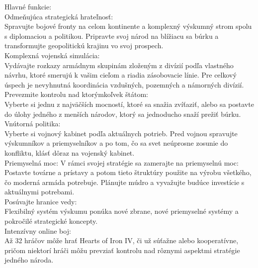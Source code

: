 \documentclass[10pt,oneside,slovak,a4paper]{article}
\begin{document}
Hlavné funkcie:\\
Odmeňujúca strategická hrateľnosť:\\
Spravujte bojové fronty na celom kontinente a komplexný výskumný strom spolu s diplomaciou a politikou. Pripravte svoj národ na blížiacu sa búrku a transformujte geopolitickú krajinu vo svoj prospech.\\
Komplexná vojenská simulácia:\\
Vydávajte rozkazy armádnym skupinám zloženým z divízií podľa vlastného návrhu, ktoré smerujú k vašim cieľom a riadia zásobovacie línie. Pre celkový úspech je nevyhnutná koordinácia vzdušných, pozemných a námorných divízií.
Prevezmite kontrolu nad ktorýmkoľvek štátom:\\
Vyberte si jednu z najväčších mocností, ktoré sa snažia zvíťaziť, alebo sa postavte do úlohy jedného z menších národov, ktorý sa jednoducho snaží prežiť búrku.\\
Vnútorná politika:\\
Vyberte si vojnový kabinet podľa aktuálnych potrieb. Pred vojnou spravujte výskumníkov a priemyselníkov a po tom, čo sa svet neúprosne zosunie do konfliktu, klásť dôraz na vojenský kabinet.\\
Priemyselná moc: V rámci svojej stratégie sa zamerajte na priemyselnú moc:\\
Postavte továrne a prístavy a potom tieto štruktúry použite na výrobu všetkého, čo moderná armáda potrebuje. Plánujte múdro a vyvažujte budúce investície s aktuálnymi potrebami.\\
Posúvajte hranice vedy:\\
Flexibilný systém výskumu ponúka nové zbrane, nové priemyselné systémy a pokročilé strategické koncepty.\\
Intenzívny online boj:\\
Až 32 hráčov môže hrať Hearts of Iron IV, či už súťažne alebo kooperatívne, pričom niektorí hráči môžu prevziať kontrolu nad rôznymi aspektmi stratégie jedného národa.\\
\end{document}
